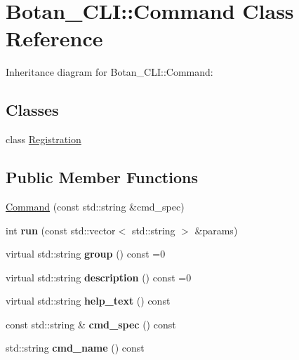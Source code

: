 \hypertarget{class_botan___c_l_i_1_1_command}{}\section{Botan\+\_\+\+C\+LI\+:\+:Command Class Reference}
\label{class_botan___c_l_i_1_1_command}


Inheritance diagram for Botan\+\_\+\+C\+LI\+:\+:Command\+:
\subsection*{Classes}
\begin{DoxyCompactItemize}
\item 
class \mbox{\hyperlink{class_botan___c_l_i_1_1_command_1_1_registration}{Registration}}
\end{DoxyCompactItemize}
\subsection*{Public Member Functions}
\begin{DoxyCompactItemize}
\item 
\mbox{\hyperlink{class_botan___c_l_i_1_1_command_add9ddc955a88a37b3b7e278c44341b0d}{Command}} (const std\+::string \&cmd\+\_\+spec)
\item 
\mbox{\label{class_botan___c_l_i_1_1_command_a67b7587959b00c690517f312b49d8c8a}} 
int {\bfseries run} (const std\+::vector$<$ std\+::string $>$ \&params)
\item 
\mbox{\label{class_botan___c_l_i_1_1_command_a4f9aa9683a165ff144c3e6d7a2cdab09}} 
virtual std\+::string {\bfseries group} () const =0
\item 
\mbox{\label{class_botan___c_l_i_1_1_command_ac6982ff30a7d26152b2d3527b38ffe9b}} 
virtual std\+::string {\bfseries description} () const =0
\item 
\mbox{\label{class_botan___c_l_i_1_1_command_a16620a8027f6677153928ab925a1e27b}} 
virtual std\+::string {\bfseries help\+\_\+text} () const
\item 
\mbox{\label{class_botan___c_l_i_1_1_command_aad7da7e22c35a4801c57a9b550d33318}} 
const std\+::string \& {\bfseries cmd\+\_\+spec} () const
\item 
\mbox{\label{class_botan___c_l_i_1_1_command_a411a8003fab3ff1bc1278ddddfd88e43}} 
std\+::string {\bfseries cmd\+\_\+name} () const
\end{DoxyCompactItemize}
